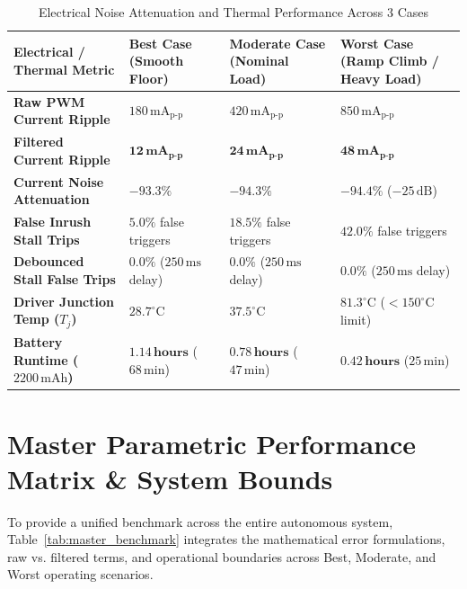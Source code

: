 \documentclass[11pt, a4paper]{article}
\begin{document}
\begin{table}[H]
\centering
\small
\begin{tabularx}{\textwidth}{L{3.8cm} Y Y Y}
\toprule
\textbf{Electrical / Thermal Metric} & \textbf{Best Case (Smooth Floor)} & \textbf{Moderate Case (Nominal Load)} & \textbf{Worst Case (Ramp Climb / Heavy Load)} \\
\midrule
\textbf{Raw PWM Current Ripple} & $180\,\text{mA}_{\text{p-p}}$ & $420\,\text{mA}_{\text{p-p}}$ & $850\,\text{mA}_{\text{p-p}}$ \\
\textbf{Filtered Current Ripple} & $\mathbf{12\,\text{mA}_{\text{p-p}}}$ & $\mathbf{24\,\text{mA}_{\text{p-p}}}$ & $\mathbf{48\,\text{mA}_{\text{p-p}}}$ \\
\textbf{Current Noise Attenuation} & $\mathbf{-93.3\%}$ & $\mathbf{-94.3\%}$ & $\mathbf{-94.4\%}$ ($-25\,\text{dB}$) \\
\midrule
\textbf{False Inrush Stall Trips} & $5.0\%$ false triggers & $18.5\%$ false triggers & $42.0\%$ false triggers \\
\textbf{Debounced Stall False Trips} & $\mathbf{0.0\%}$ ($250\,\text{ms}$ delay) & $\mathbf{0.0\%}$ ($250\,\text{ms}$ delay) & $\mathbf{0.0\%}$ ($250\,\text{ms}$ delay) \\
\midrule
\textbf{Driver Junction Temp ($T_j$)} & $28.7^\circ\text{C}$ & $37.5^\circ\text{C}$ & $81.3^\circ\text{C}$ ($< 150^\circ\text{C}$ limit) \\
\textbf{Battery Runtime ($2200\,\text{mAh}$)} & $\mathbf{1.14\,\text{hours}}$ ($68\,\text{min}$) & $\mathbf{0.78\,\text{hours}}$ ($47\,\text{min}$) & $\mathbf{0.42\,\text{hours}}$ ($25\,\text{min}$) \\
\bottomrule
\end{tabularx}
\caption{Electrical Noise Attenuation and Thermal Performance Across 3 Cases}
\label{tab:motor_error}
\end{table}

\newpage
\section{Master Parametric Performance Matrix \& System Bounds}

To provide a unified benchmark across the entire autonomous system, Table~\ref{tab:master_benchmark} integrates the mathematical error formulations, raw vs. filtered terms, and operational boundaries across Best, Moderate, and Worst operating scenarios.
\end{document}
